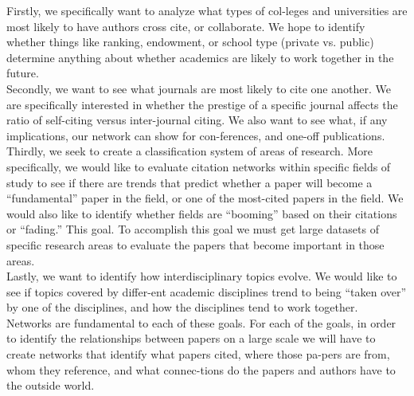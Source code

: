 \documentclass[times, 10pt,twocolumn]{article}
\begin{document}
Firstly, we specifically want to analyze what types of col-leges and universities are most likely to have authors cross cite, or collaborate. We hope to identify whether things like ranking, endowment, or school type (private vs. public) determine anything about whether academics are likely to work together in the future.\\
Secondly, we want to see what journals are most likely to cite one another. We are specifically interested in whether the prestige of a specific journal affects the ratio of self-citing versus inter-journal citing. We also want to see what, if any implications, our network can show for con-ferences, and one-off publications.\\
Thirdly, we seek to create a classification system of areas of research. More specifically, we would like to evaluate citation networks within specific fields of study to see if there are trends that predict whether a paper will become a “fundamental” paper in the field, or one of the most-cited papers in the field. We would also like to identify whether fields are “booming” based on their citations or “fading.” This goal. To accomplish this goal we must get large datasets of specific research areas to evaluate the papers that become important in those areas. \\
Lastly, we want to identify how interdisciplinary topics evolve. We would like to see if topics covered by differ-ent academic disciplines trend to being “taken over” by one of the disciplines, and how the disciplines tend to work together.\\
Networks are fundamental to each of these goals. For each of the goals, in order to identify the relationships between papers on a large scale we will have to create networks that identify what papers cited, where those pa-pers are from, whom they reference, and what connec-tions do the papers and authors have to the outside world.
\end{document}
